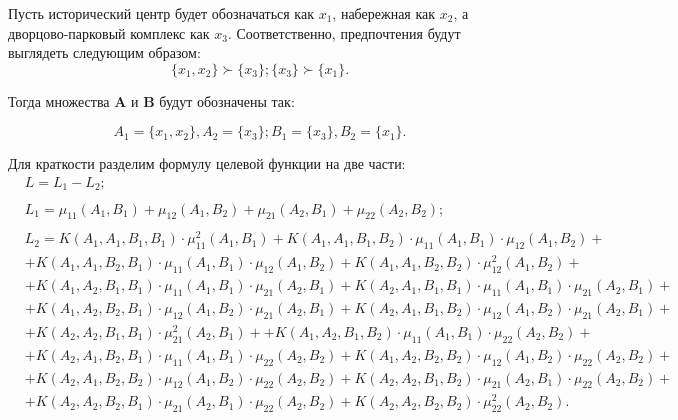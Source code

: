\documentclass[12pt,a4paper,oneside]{article}
\begin{document}
\par
Пусть исторический центр будет обозначаться как \(x_1\), набережная как \(x_2\), а дворцово-парковый комплекс как \(x_3\). 
Соответственно, предпочтения будут выглядеть следующим образом: 
\[
\{x_1, x_2\} \succ \{x_3\}; \{x_3\} \succ \{x_1\}.
\]

\par
Тогда множества \(\mathbf{A}\) и \(\mathbf{B}\) будут обозначены так:

\[
A_1 = \{x_1, x_2\}, A_2 = \{x_3\}; B_1 = \{x_3\}, B_2 = \{x_1\}.
\]

\par
Для краткости разделим формулу целевой функции на две части:
\mbox{}
\begin{eqnarray*}
& L = L_1 - L_2;\\ \\
& L_1 = \mu_{11}(A_1, B_1) + \mu_{12}(A_1, B_2) + \mu_{21}(A_2, B_1) + \mu_{22}(A_2, B_2);\\ \\
&L_2 = K(A_1, A_1, B_1, B_1) \cdot \mu^{2}_{11}(A_1, B_1)
+ K(A_1, A_1, B_1, B_2) \cdot \mu_{11}(A_1, B_1) \cdot \mu_{12}(A_1, B_2) +\\
&+ K(A_1, A_1, B_2, B_1) \cdot \mu_{11}(A_1, B_1) \cdot \mu_{12}(A_1, B_2)
+ K(A_1, A_1, B_2, B_2) \cdot \mu^{2}_{12}(A_1, B_2) +\\
&+ K(A_1, A_2, B_1, B_1) \cdot \mu_{11}(A_1, B_1) \cdot \mu_{21}(A_2, B_1)
+ K(A_2, A_1, B_1, B_1) \cdot \mu_{11}(A_1, B_1) \cdot \mu_{21}(A_2, B_1) +\\
&+ K(A_1, A_2, B_2, B_1) \cdot \mu_{12}(A_1, B_2) \cdot \mu_{21}(A_2, B_1)
+ K(A_2, A_1, B_1, B_2) \cdot \mu_{12}(A_1, B_2) \cdot \mu_{21}(A_2, B_1) +\\
&+ K(A_2, A_2, B_1, B_1) \cdot \mu^{2}_{21}(A_2, B_1)+
+ K(A_1, A_2, B_1, B_2) \cdot \mu_{11}(A_1, B_1) \cdot \mu_{22}(A_2, B_2)+\\
&+ K(A_2, A_1, B_2, B_1) \cdot \mu_{11}(A_1, B_1) \cdot \mu_{22}(A_2, B_2)
+ K(A_1, A_2, B_2, B_2) \cdot \mu_{12}(A_1, B_2) \cdot \mu_{22}(A_2, B_2) +\\
&+ K(A_2, A_1, B_2, B_2) \cdot \mu_{12}(A_1, B_2) \cdot \mu_{22}(A_2, B_2)
+ K(A_2, A_2, B_1, B_2) \cdot \mu_{21}(A_2, B_1) \cdot \mu_{22}(A_2, B_2) +\\
&+ K(A_2, A_2, B_2, B_1) \cdot \mu_{21}(A_2, B_1) \cdot \mu_{22}(A_2, B_2)
+ K(A_2, A_2, B_2, B_2) \cdot \mu^{2}_{22}(A_2, B_2).
\end{eqnarray*}
\end{document}
